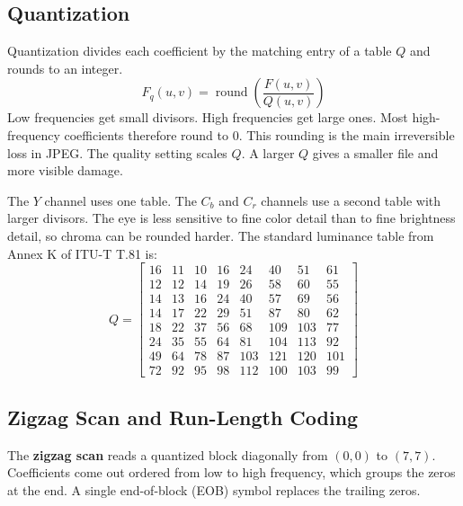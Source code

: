 \documentclass[11pt,a4paper]{article}
\begin{document}
\subsection{Quantization}

Quantization divides each coefficient by the matching entry of a table $Q$ and rounds to an integer.
\[
F_q(u,v)=\operatorname{round}\!\left(\frac{F(u,v)}{Q(u,v)}\right)
\]
Low frequencies get small divisors. High frequencies get large ones. Most high-frequency coefficients therefore round to 0. This rounding is the main irreversible loss in JPEG. The quality setting scales $Q$. A larger $Q$ gives a smaller file and more visible damage.

The $Y$ channel uses one table. The $C_b$ and $C_r$ channels use a second table with larger divisors. The eye is less sensitive to fine color detail than to fine brightness detail, so chroma can be rounded harder. The standard luminance table from Annex K of ITU-T T.81 \cite{t81} is:
\[
Q=\begin{bmatrix}
16&11&10&16& 24& 40& 51& 61\\
12&12&14&19& 26& 58& 60& 55\\
14&13&16&24& 40& 57& 69& 56\\
14&17&22&29& 51& 87& 80& 62\\
18&22&37&56& 68&109&103& 77\\
24&35&55&64& 81&104&113& 92\\
49&64&78&87&103&121&120&101\\
72&92&95&98&112&100&103& 99
\end{bmatrix}
\]

\subsection{Zigzag Scan and Run-Length Coding}

The \textbf{zigzag scan} reads a quantized block diagonally from $(0,0)$ to $(7,7)$. Coefficients come out ordered from low to high frequency, which groups the zeros at the end. A single end-of-block (EOB) symbol replaces the trailing zeros.
\end{document}
